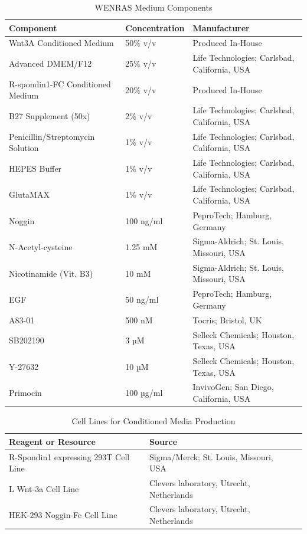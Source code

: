 \begin{flushleft}
\begin{table}[htbp]
\caption{WENRAS Medium Components}
\label{tab:wenras_medium_components}
\begin{tabularx}{\textwidth}{Xll}
\toprule
\textbf{Component} & \textbf{Concentration} & \textbf{Manufacturer} \\
\midrule
Wnt3A Conditioned Medium & 50\% v/v & Produced In-House \\
Advanced DMEM/F12 & 25\% v/v & Life Technologies; Carlsbad, California, USA \\
R-spondin1-FC Conditioned Medium & 20\% v/v & Produced In-House \\
B27 Supplement (50x) & 2\% v/v & Life Technologies; Carlsbad, California, USA \\
Penicillin/Streptomycin Solution & 1\% v/v & Life Technologies; Carlsbad, California, USA \\
HEPES Buffer & 1\% v/v & Life Technologies; Carlsbad, California, USA \\
GlutaMAX & 1\% v/v & Life Technologies; Carlsbad, California, USA \\
Noggin & 100 ng/ml & PeproTech; Hamburg, Germany \\
N-Acetyl-cysteine & 1.25 mM & Sigma-Aldrich; St. Louis, Missouri, USA \\
Nicotinamide (Vit. B3) & 10 mM & Sigma-Aldrich; St. Louis, Missouri, USA \\
EGF & 50 ng/ml & PeproTech; Hamburg, Germany \\
A83-01 & 500 nM & Tocris; Bristol, UK \\
SB202190 & 3 µM & Selleck Chemicals; Houston, Texas, USA \\
Y-27632 & 10 µM & Selleck Chemicals; Houston, Texas, USA \\ 
Primocin & 100 µg/ml & InvivoGen; San Diego, California, USA \\
\bottomrule
\end{tabularx}
\end{table}

\begin{table}[htb]
\caption{Cell Lines for Conditioned Media Production}
\label{tab:cellline} %
\begin{tabularx}{\textwidth}{Xll}
\toprule
\textbf{Reagent or Resource} & \textbf{Source}\\
\midrule
R-Spondin1 expressing 293T Cell Line & Sigma/Merck; St. Louis, Missouri, USA  \\
L Wnt-3a Cell Line & Clevers laboratory, Utrecht, Netherlands \\
HEK-293 Noggin-Fc Cell Line & Clevers laboratory, Utrecht, Netherlands \\
\bottomrule
\end{tabularx}
\end{table}


\end{flushleft}
